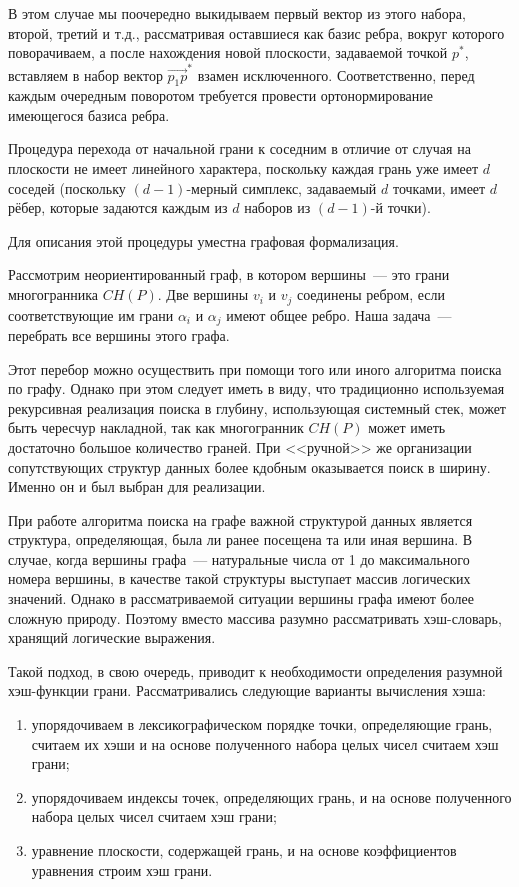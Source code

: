 \documentclass[14pt]{extarticle}
\begin{document}
В этом случае мы поочередно выкидываем первый вектор из этого набора, второй, третий и т.д., рассматривая оставшиеся как базис ребра, вокруг которого поворачиваем, а после нахождения новой плоскости, задаваемой точкой $p^*$, вставляем в набор вектор $\overrightarrow{p_1p}^*$ взамен исключенного. Соответственно, перед каждым очередным поворотом требуется провести ортонормирование имеющегося базиса ребра.

\medskip

Процедура перехода от начальной грани к соседним в отличие от случая на плоскости не имеет линейного характера, поскольку каждая грань уже имеет $d$ соседей (поскольку $(d-1)$-мерный симплекс, задаваемый $d$ точками, имеет $d$ рёбер, которые задаются каждым из $d$ наборов из $(d-1)$-й точки).

Для описания этой процедуры уместна графовая формализация.

Рассмотрим неориентированный граф, в котором вершины~--- это грани многогранника $CH(P)$. Две вершины $v_i$ и $v_j$ соединены ребром, если соответствующие им грани $\alpha_i$ и $\alpha_j$ имеют общее ребро. Наша задача~--- перебрать все вершины этого графа.

Этот перебор можно осуществить при помощи того или иного алгоритма поиска по графу. Однако при этом следует иметь в виду, что традиционно используемая рекурсивная реализация поиска в глубину, использующая системный стек, может быть чересчур накладной, так как многогранник $CH(P)$ может иметь достаточно большое количество граней. При <<ручной>> же организации сопутствующих структур данных более кдобным оказывается поиск в ширину. Именно он и был выбран для реализации.

При работе алгоритма поиска на графе важной структурой данных является структура, определяющая, была ли ранее посещена та или иная вершина. В случае, когда вершины графа~--- натуральные числа от 1 до максимального номера вершины, в качестве такой структуры выступает массив логических значений. Однако в рассматриваемой ситуации вершины графа имеют более сложную природу. Поэтому вместо массива разумно рассматривать хэш-словарь, хранящий логические выражения.

Такой подход, в свою очередь, приводит к необходимости определения разумной хэш-функции грани. Рассматривались следующие варианты вычисления хэша:
\begin{enumerate}[topsep=-0.5\parsep,itemsep=-0.5\parsep]
  \item упорядочиваем в лексикографическом порядке точки, определяющие грань, считаем их хэши и на основе полученного набора целых чисел считаем хэш грани;

  \item упорядочиваем индексы точек, определяющих грань, и на основе полученного набора целых чисел считаем хэш грани;

  \item уравнение плоскости, содержащей грань, и на основе коэффициентов уравнения строим хэш грани.
\end{enumerate}
\end{document}
